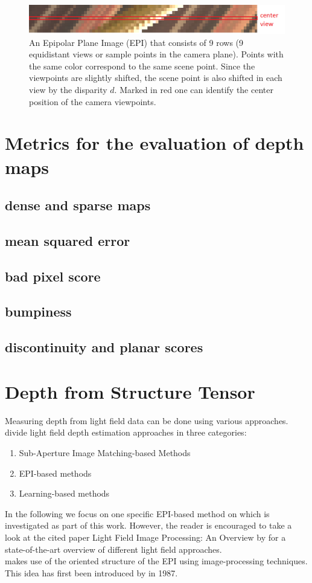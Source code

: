 \documentclass  [
  paper    = a4,
  BCOR     = 10mm,
  twoside,
  fontsize = 12pt,
  fleqn,
  toc      = bibnumbered,
  toc      = listofnumbered,
  numbers  = noendperiod,
  headings = normal,
  listof   = leveldown,
  version  = 3.03
]                                       {scrreprt}
\begin{document}
\begin{figure}
	\centering
	\includegraphics[width=1\linewidth]{images/simple_epi}
	\caption[Example Epipolar Plane image]{An Epipolar Plane Image (EPI) that consists of 9 rows (9 equidistant views or sample points in the camera plane). Points with the same color correspond to the same scene point. Since the viewpoints are slightly shifted, the scene point is also shifted in each view by the disparity $d$. Marked in red one can identify the center position of the camera viewpoints.}
	\label{fig:simpleepi}
\end{figure}
\section{Metrics for the evaluation of depth maps}
\subsection{dense and sparse maps}
\subsection{mean squared error}
\subsection{bad pixel score}
\subsection{bumpiness}
\subsection{discontinuity and planar scores}
\section{Depth from Structure Tensor}
Measuring depth from light field data can be done using various approaches.
\cite{wu2017light} divide light field depth estimation approaches in three categories:
\begin{enumerate}
	\item Sub-Aperture Image Matching-based Methods
	\item EPI-based methods
	\item Learning-based methods
\end{enumerate}
In the following we focus on one specific EPI-based method on which is investigated as part of this work. However, the reader is encouraged to take a look at the cited paper \glqq Light Field Image Processing: An Overview \grqq by \cite{wu2017light} for a state-of-the-art overview of different light field approaches.\\
\cite{wanner2014orientation} makes use of the oriented structure of the EPI using image-processing techniques. This idea has first been introduced by \cite{bigun1987optimal} in 1987.\\
\end{document}
